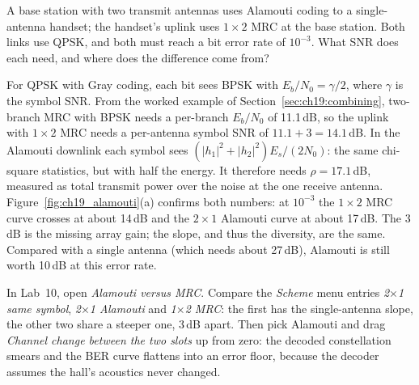 \begin{worked}
A base station with two transmit antennas uses Alamouti coding to a single-antenna handset; the
handset's uplink uses $1\times2$ MRC at the base station. Both links use QPSK, and both must reach a
bit error rate of $10^{-3}$. What SNR does each need, and where does the difference come from?

For QPSK with Gray coding, each bit sees BPSK with $E_b/N_0=\gamma/2$, where $\gamma$ is the
symbol SNR. From the worked example of Section~\ref{sec:ch19:combining}, two-branch MRC with BPSK
needs a per-branch $E_b/N_0$ of 11.1\,dB, so the uplink with $1\times2$ MRC needs a per-antenna symbol
SNR of $11.1+3=14.1$\,dB. In the Alamouti downlink each symbol sees
$(|h_1|^2+|h_2|^2)E_s/(2N_0)$: the same chi-square statistics, but with half the energy. It
therefore needs $\rho=17.1$\,dB, measured as total transmit power over the noise at the one
receive antenna. Figure~\ref{fig:ch19_alamouti}(a) confirms both numbers: at $10^{-3}$ the
$1\times2$ MRC curve crosses at about 14\,dB and the $2\times1$ Alamouti curve at about 17\,dB.
The 3\,dB is the missing array gain; the slope, and thus the diversity, are the same. Compared
with a single antenna (which needs about 27\,dB), Alamouti is still worth 10\,dB at this
error rate.
\end{worked}


\begin{tryit}
In Lab~10, open \emph{Alamouti versus MRC}. Compare the \emph{Scheme} menu entries
\emph{2$\times$1 same symbol}, \emph{2$\times$1 Alamouti} and \emph{1$\times$2 MRC}: the first has
the single-antenna slope, the other two share a steeper one, 3\,dB apart. Then pick Alamouti and drag
\emph{Channel change between the two slots} up from zero: the decoded constellation smears and the
BER curve flattens into an error floor, because the decoder assumes the hall's acoustics never
changed.
\end{tryit}

